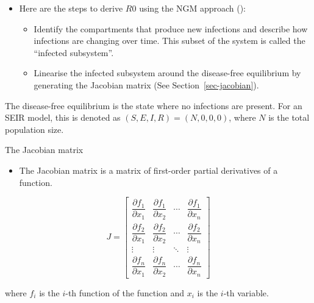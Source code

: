 \documentclass[
  ignorenonframetext,
]{beamer}
\providecommand{\tightlist}{%
  \setlength{\itemsep}{0pt}\setlength{\parskip}{0pt}}\usepackage{longtable,booktabs,array}
\begin{document}
\begin{frame}
\begin{itemize}
\tightlist
\item
  Here are the steps to derive \(R0\) using the NGM approach
  ():

  \begin{itemize}
  \tightlist
  \item
    Identify the compartments that produce new infections and describe
    how infections are changing over time. This subset of the system is
    called the ``infected subsystem''.
  \item
    Linearise the infected subsystem around the disease-free equilibrium
    by generating the Jacobian matrix (See Section~\ref{sec-jacobian}).
  \end{itemize}
\end{itemize}

\begin{tcolorbox}[enhanced jigsaw, toprule=.15mm, opacityback=0, bottomtitle=1mm, opacitybacktitle=0.6, colframe=quarto-callout-note-color-frame, titlerule=0mm, breakable, colback=white, title=\textcolor{quarto-callout-note-color}{\faInfo}\hspace{0.5em}{Note}, left=2mm, colbacktitle=quarto-callout-note-color!10!white, arc=.35mm, coltitle=black, bottomrule=.15mm, rightrule=.15mm, leftrule=.75mm, toptitle=1mm]

The disease-free equilibrium is the state where no infections are
present. For an SEIR model, this is denoted as
\((S, E, I, R) = (N, 0, 0, 0)\), where \(N\) is the total population
size.

\end{tcolorbox}
\end{frame}

\begin{frame}
\begin{block}{The Jacobian matrix}
\label{sec-jacobian}
\begin{itemize}
\tightlist
\item
  The Jacobian matrix is a matrix of first-order partial derivatives of
  a function.
\end{itemize}

\begin{equation*}
J = \begin{bmatrix}
\dfrac{\partial f_1}{\partial x_1} & \dfrac{\partial f_1}{\partial x_2} & \cdots & \dfrac{\partial f_1}{\partial x_n} \\
\dfrac{\partial f_2}{\partial x_1} & \dfrac{\partial f_2}{\partial x_2} & \cdots & \dfrac{\partial f_2}{\partial x_n} \\
\vdots & \vdots & \ddots & \vdots \\
\dfrac{\partial f_n}{\partial x_1} & \dfrac{\partial f_n}{\partial x_2} & \cdots & \dfrac{\partial f_n}{\partial x_n}
\end{bmatrix}
\end{equation*}

where \(f_i\) is the \(i\)-th function of the function and \(x_i\) is
the \(i\)-th variable.
\end{block}
\end{frame}
\end{document}
